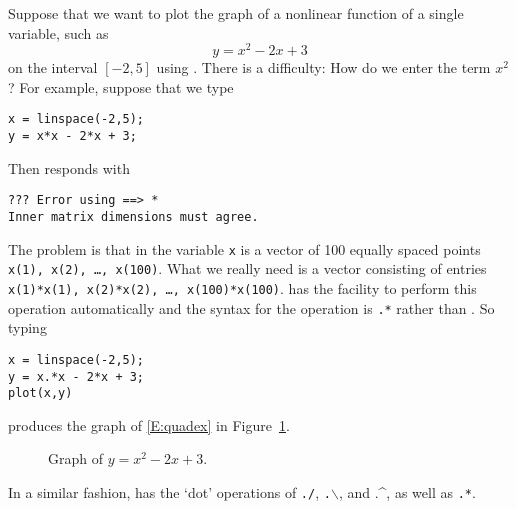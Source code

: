 \documentclass{ximera}
\begin{document}
Suppose that we want to plot the graph of a nonlinear function of
a single variable, such as
\begin{equation}  \label{E:quadex}
y = x^2 - 2x + 3
\end{equation}
on the interval $[-2,5]$ using \Matlabp.  There is a difficulty:  How
do we enter the term $x^2$?  For example, suppose that we type
\begin{verbatim}
x = linspace(-2,5);
y = x*x - 2*x + 3;
\end{verbatim}
Then \Matlab responds with
\begin{verbatim}
??? Error using ==> *
Inner matrix dimensions must agree.
\end{verbatim}
The problem is that in \Matlab the variable {\tt x} is a vector of
100 equally spaced points {\tt x(1), x(2), \ldots, x(100)}.  What we
really need is a vector consisting of entries {\tt x(1)*x(1), x(2)*x(2),
\ldots, x(100)*x(100)}.  \Matlab has the facility to perform this
operation automatically and the syntax for the operation is {\tt .*}
rather than {\tt *}.  So typing
\begin{verbatim}
x = linspace(-2,5);
y = x.*x - 2*x + 3;
plot(x,y)
\end{verbatim}
produces the graph of \eqref{E:quadex} in Figure~\ref{F:quadex}.
\begin{figure}[htb]
              \centerline{%
              }
              \caption{Graph of $y = x^2 - 2x + 3$.}
              \label{F:quadex}
\end{figure}
In a similar fashion, \Matlab has the `dot' operations of
{\tt ./},
{\tt .$\backslash$}, and  .\^{}, as well
as {\tt .*}.

\EXER



\TEXER
\end{document}

